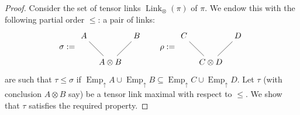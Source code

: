 \documentclass[12pt]{article}
\theoremstyle{plain}
\theoremstyle{definition}
\begin{document}
	\begin{proof}
		Consider the set of tensor links $\operatorname{Link}_{\otimes}(\pi)$ of $\pi$. We endow this with the following partial order $\leq$: a pair of links:
		\[
		\sigma := 
		\begin{tikzcd}[column sep = tiny]
			A\arrow[dr,dash] && B\arrow[dl,dash]\\
			& A \otimes B
		\end{tikzcd}
		\qquad
		\rho :=
		\begin{tikzcd}[column sep = tiny]
			C\arrow[dr,dash] && D\arrow[dl,dash]\\
			& C \otimes D
		\end{tikzcd}
		\]
		are such that $\tau \leq \sigma$ if $\operatorname{Emp}_{\uparrow}A \cup \operatorname{Emp}_{\uparrow}B \subseteq \operatorname{Emp}_{\uparrow}C \cup \operatorname{Emp}_{\uparrow}D$. Let $\tau$ (with conclusion $A \otimes B$ say) be a tensor link maximal with respect to $\leq$. We show that $\tau$ satisfies the required property.
		

\end{proof}
\end{document}
